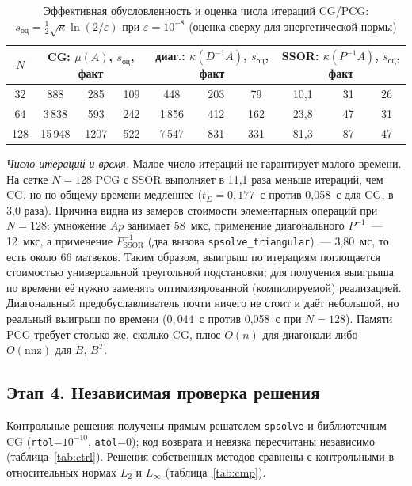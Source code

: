 \documentclass[12pt]{article}
\begin{document}
\begin{table}[H]
\centering
\caption{Эффективная обусловленность и оценка числа итераций CG/PCG: $s_{\text{оц}}=\frac12\sqrt{\kappa}\ln(2/\varepsilon)$ при $\varepsilon=10^{-8}$ (оценка сверху для энергетической нормы)}
\label{tab:cond}
\scriptsize
\begin{tabular}{|c|c|c|c|c|c|c|c|c|c|}
\hline
$N$ & \multicolumn{3}{c|}{CG: $\mu(A)$, $s_{\text{оц}}$, факт} & \multicolumn{3}{c|}{диаг.: $\kappa(D^{-1}A)$, $s_{\text{оц}}$, факт} & \multicolumn{3}{c|}{SSOR: $\kappa(P^{-1}A)$, $s_{\text{оц}}$, факт} \\
\hline
32 & 888 & 285 & 109 & 448 & 203 & 79 & 10,1 & 31 & 26 \\
64 & 3\,838 & 593 & 242 & 1\,856 & 412 & 162 & 23,8 & 47 & 31 \\
128 & 15\,948 & 1207 & 522 & 7\,547 & 831 & 331 & 81,3 & 87 & 47 \\
\hline
\end{tabular}
\end{table}

\textit{Число итераций и время.} Малое число итераций не гарантирует малого времени. На сетке $N=128$ PCG с SSOR выполняет в 11,1 раза меньше итераций, чем CG, но по общему времени медленнее ($t_\Sigma=0,177$~с против 0,058~с для CG, в 3,0 раза). Причина видна из замеров стоимости элементарных операций при $N=128$: умножение $Ap$ занимает 58~мкс, применение диагонального $P^{-1}$~--- 12~мкс, а применение $P_\text{SSOR}^{-1}$ (два вызова \texttt{spsolve\_triangular})~--- 3,80~мс, то есть около 66 матвеков. Таким образом, выигрыш по итерациям поглощается стоимостью универсальной треугольной подстановки; для получения выигрыша по времени её нужно заменять оптимизированной (компилируемой) реализацией. Диагональный предобуславливатель почти ничего не стоит и даёт небольшой, но реальный выигрыш по времени ($0,044$~с против 0,058~с при $N=128$). Памяти PCG требует столько же, сколько CG, плюс $O(n)$ для диагонали либо $O(\mathrm{nnz})$ для $B$, $B^T$.\par

\subsection{Этап 4. Независимая проверка решения}

Контрольные решения получены прямым решателем \texttt{spsolve} и библиотечным CG (\texttt{rtol}=$10^{-10}$, \texttt{atol}=0); код возврата и невязка пересчитаны независимо (таблица~\ref{tab:ctrl}). Решения собственных методов сравнены с контрольными в относительных нормах $L_2$ и $L_\infty$ (таблица~\ref{tab:cmp}).\par
\end{document}
